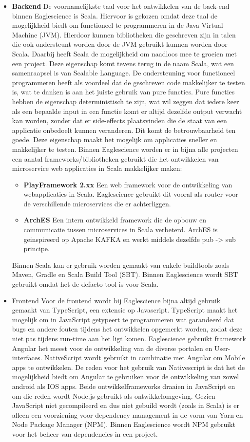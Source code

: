 \begin{itemize}
    \item \textbf{Backend} De voornamelijkste taal voor het ontwikkelen van de back-end binnen Eaglescience is Scala. Hiervoor is gekozen omdat deze taal de mogelijkheid biedt om functioneel te programmeren in de Java Virtual Machine (JVM). Hierdoor kunnen bibliotheken die geschreven zijn in talen die ook ondersteunt worden door de JVM gebruikt kunnen worden door Scala. Daarbij heeft Scala de mogelijkheid om naadloos mee te groeien met een project. Deze eigenschap komt tevens terug in de naam Scala, wat een samenraapsel is van Scalable Language. De ondersteuning voor functioneel programmeren heeft als voordeel dat de geschreven code makkelijker te testen is, wat te danken is aan het juiste gebruik van pure functies. Pure functies hebben de eigenschap deterministisch te zijn, wat wil zeggen dat iedere keer als een bepaalde input in een functie komt er altijd dezelfde output verwacht kan worden, zonder dat er side-effects plaatsvinden die de staat van een applicatie onbedoelt kunnen veranderen. Dit komt de betrouwbaarheid ten goede. Deze eigenschap maakt het mogelijk om applicaties sneller en makkelijker te testen. Binnen Eaglescience worden er in bijna alle projecten een aantal frameworks/bibliotheken gebruikt die het ontwikkelen van microservice web applicaties in Scala makkelijker maken:
    \begin{itemize}
        \item \textbf{PlayFramework 2.xx} Een web framework voor de ontwikkeling van webapplicaties in Scala. Eaglescience gebruikt dit vooral als router voor de verschillende microservices die er achterliggen.
        \item \textbf{ArchES} Een intern ontwikkeld framework die de opbouw en communicatie tussen microservices in Scala verbeterd. ArchES is geinspireerd op Apache KAFKA en werkt middels dezelfde pub -> sub principe.
    \end{itemize} Binnen Scala kan er gebruik worden gemaakt van enkele buildtools zoals Maven, Gradle en Scala Build Tool (SBT). Binnen Eaglescience wordt SBT gebruikt omdat het de defacto tool is voor Scala.
    \item {Frontend}
    Voor de frontend wordt bij Eaglescience bijna altijd gebruik gemaakt van TypeScript, een extensie op Javascript. TypeScript maakt het mogelijk om in JavaScript getypeert te programmeren wat garandeerd dat bugs en andere fouten tijdens het ontwikkelen opgemerkt worden, zodat deze niet pas tijdens run-time aan het ligt komen. Eaglescience gebruikt framework Angular het meest voor de ontwikkeling van de diverse portalen en User-interfaces. NativeScript wordt gebruikt in combinatie met Angular om Mobile apps te ontwikkelen. De reden voor het gebruik van Nativescript is dat het de mogelijkheid biedt om Angular te gebruiken voor de ontwikkeling van zowel android als IOS apps. Beide ontwikkelframeworks draaien in JavaScript en om die reden wordt Node.js gebruikt als ontwikkelomgeving. Gezien JavaScript niet gecompileerd en dus niet gebuild wordt (zoals in Scala) is er alleen een voorziening voor dependency management in de vorm van Yarn en Node Package Manager (NPM). Binnen Eaglescience wordt NPM gebruikt voor het beheer van dependencies in een project.

\end{itemize}
